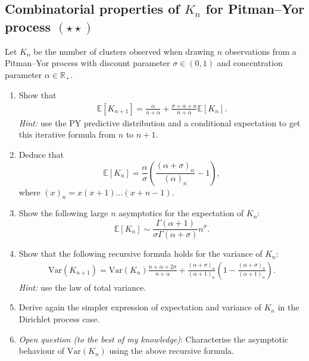 \documentclass{article}
\begin{document}
\subsection{Combinatorial properties of $K_n$ for Pitman--Yor process $(\star\star)$}
\label{ex:K_n-PY}
Let $K_n$ be the number of clusters observed when drawing $n$ observations from a Pitman--Yor process with discount parameter $\sigma\in(0,1)$ and concentration parameter $\alpha\in\mathbb{R}_+$.

\begin{enumerate}
	\item Show that
\begin{align*}
    \mathbb{E}[K_{n+1}]= \frac{\alpha}{n+\alpha} + \frac{\sigma + \alpha +n}{n+ \alpha}\mathbb{E}\left[K_n\right].
\end{align*}
\textit{Hint:} use the PY predictive distribution and a conditional expectation to get this iterative formula from $n$ to $n+1$.
	\item Deduce that
\begin{equation*}
        \mathbb{E}[K_n] = \frac{\alpha}{\sigma}\left(\frac{(\alpha +\sigma)_{n}}{(\alpha)_{n}}-1\right),
\end{equation*}
where $(x)_n = x(x+1)\ldots(x+n-1)$.
	\item Show the following large $n$ asymptotics for the expectation of $K_n$:
\begin{equation*}
        \mathbb{E}[K_n] \sim \frac{\Gamma(\alpha+1)}{\sigma \Gamma(\alpha+\sigma)}n^\sigma.
\end{equation*}
\item Show that the following recursive formula holds for the variance of $K_n$:
\begin{align*}
\mbox{Var}(K_{n+1}) = \mbox{Var}(K_n)\frac{n + \alpha + 2\sigma}{n+\alpha} + \frac{(\alpha +\sigma)_{n}}{(\alpha+1)_{n}}\left(1-\frac{(\alpha +\sigma)_{n}}{(\alpha+1)_{n}}\right).
\end{align*}
\textit{Hint:} use the law of total variance.
\item Derive again the simpler expression of expectation and variance of $K_n$ in the Dirichlet process case.
\item \textit{Open question (to the best of my knowledge)}: Characterise the asymptotic behaviour of $\mbox{Var}(K_n)$ using the above recursive formula.
\end{enumerate}
\end{document}

